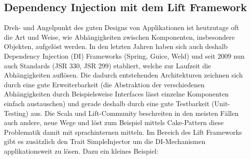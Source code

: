 \subsection{Dependency Injection mit dem Lift Framework}\label{lift:di}
Dreh- und Angelpunkt des guten Designs von Applikationen ist heutzutage oft die Art und Weise, wie Abh\"angigkeiten zwischen Komponenten, insbesondere Objekten, aufgel\"ost werden. In den letzten Jahren haben sich auch deshalb Dependency Injection (DI) Frameworks (Spring, Guice, Weld) und seit 2009 nun auch Standards (JSR 330, JSR 299) etabliert, welche zur Laufzeit die Abh\"angigkeiten aufl\"osen. Die dadurch entstehenden Architekturen zeichnen sich durch eine gute Erweiterbarkeit (die Abstraktion der verschiedenen Abh\"angigkeiten durch Beispielsweise Interfaces l\"asst einzelne Komponenten einfach austauschen) und gerade deshalb durch eine gute Testbarkeit (Unit-Testing) aus. Die Scala und Lift-Community beschreiten in den meisten F\"allen auch andere, neue Wege und l\"ost zum Beispiel mittels Cake-Pattern\cite{bonerCakePattern}\cite{oderskyCakePattern} diese Problematik damit mit sprachinternen mitteln. Im Bereich des Lift Frameworks gibt es zus\"atzlich den Trait SimpleInjector um  die DI-Mechanismen applikationsweit zu l\"osen. Dazu ein kleines Beispiel:

